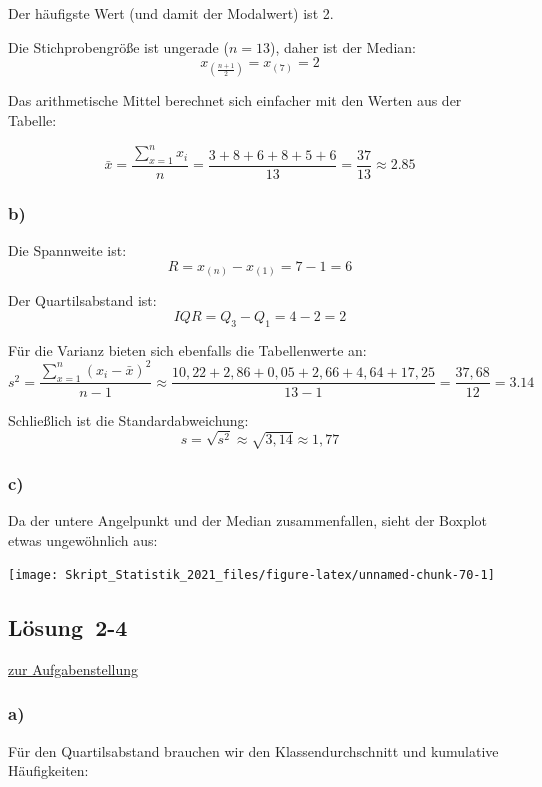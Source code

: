 \documentclass[
  11pt,
  ngerman,
  a4paper,
]{report}
\begin{document}
Der häufigste Wert (und damit der Modalwert) ist 2.

Die Stichprobengröße ist ungerade (\(n=13\)), daher ist der Median: \[x_{(\frac{n+1}{2})} = x_{(7)} = 2\]

Das arithmetische Mittel berechnet sich einfacher mit den Werten aus der Tabelle:

\[\bar{x}={\displaystyle\frac{\sum\limits_{x=1}^nx_i}{n}}=\frac{3+8+6+8+5+6}{13}=\frac{37}{13}\approx2.85\]

\hypertarget{b-4}{%
\subsubsection{b)}\label{b-4}}

Die Spannweite ist: \[R=x_{(n)}-x_{(1)}=7-1=6\]

Der Quartilsabstand ist: \[\mathit{IQR}=Q_3-Q_1=4-2=2\]

Für die Varianz bieten sich ebenfalls die Tabellenwerte an: \[s^2=\frac{\sum\limits_{x=1}^n(x_i-\bar{x})^2}{n-1}\approx\frac{10,22+ 2,86+ 0,05+ 2,66+ 4,64+17,25}{13-1}=\frac{37,68}{12}=3.14\]

Schließlich ist die Standardabweichung: \[s=\sqrt{s^2}\approx\sqrt{3,14}\approx1,77\]

\hypertarget{c-4}{%
\subsubsection{c)}\label{c-4}}

Da der untere Angelpunkt und der Median zusammenfallen, sieht der Boxplot etwas ungewöhnlich aus:

\begin{center}\texttt{[image: Skript\_Statistik\_2021\_files/figure-latex/unnamed-chunk-70-1]} \end{center}

\hypertarget{loesung-2-4}{%
\subsection{Lösung~2-4}\label{loesung-2-4}}

\protect\hyperlink{aufgabe-2-4}{zur Aufgabenstellung}

\hypertarget{a-5}{%
\subsubsection{a)}\label{a-5}}

Für den Quartilsabstand brauchen wir den Klassendurchschnitt und kumulative Häufigkeiten:
\end{document}
